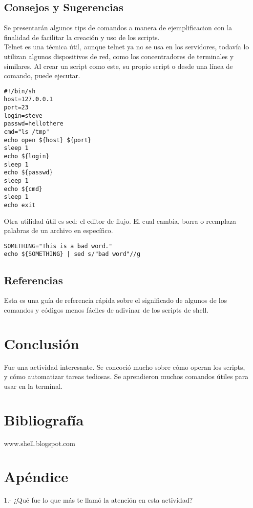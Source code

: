 \documentclass{article}
\begin{document}
\begin{itemize}
\subsection*{Consejos y Sugerencias}
Se presentarán algunos tips de comandos a manera de ejemplificacion con la finalidad de facilitar la creación y uso de los scripts.\\
Telnet es una técnica útil, aunque telnet ya no se usa en los servidores, todavía lo utilizan algunos dispositivos de red, como los concentradores de terminales y similares. Al crear un script como este, su propio script o desde una línea de comando, puede ejecutar.
\begin{verbatim}
#!/bin/sh
host=127.0.0.1
port=23
login=steve
passwd=hellothere
cmd="ls /tmp"
echo open ${host} ${port}
sleep 1
echo ${login}
sleep 1
echo ${passwd}
sleep 1
echo ${cmd}
sleep 1
echo exit
\end{verbatim}
Otra utilidad útil es sed: el editor de flujo. El cual cambia, borra o reemplaza palabras de un archivo en específico.
\begin{verbatim}
SOMETHING="This is a bad word."
echo ${SOMETHING} | sed s/"bad word"//g
\end{verbatim}
\subsection*{Referencias}
Esta es una guía de referencia rápida sobre el significado de algunos de los comandos y códigos menos fáciles de adivinar de los scripts de shell.


\section{Conclusión}

Fue una actividad interesante. Se concoció mucho sobre cómo operan los scripts, y cómo automatizar tareas tediosas. Se aprendieron muchos comandos útiles para usar en la terminal.

\section{Bibliografía}

www.shell.blogspot.com

\section{Apéndice}

1.- ¿Qué fue lo que más te llamó la atención en esta actividad?


\end{itemize}
\end{document}
